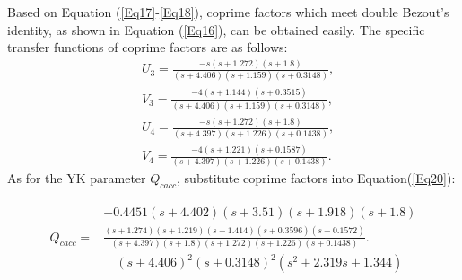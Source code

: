 \documentclass[trsc,nonblindrev]{informs3} %
\begin{document}
Based on Equation (\ref{Eq17}-\ref{Eq18}), coprime factors which meet double Bezout's identity, as shown in Equation (\ref{Eq16}), can be obtained easily. The specific transfer functions of coprime factors are as follows:
\begin{equation}
    \begin{aligned}
         & U_{3}=\frac{-s(s+1.272)(s+1.8)}{(s+4.406)(s+1.159)(s+0.3148)},    \\
         & V_{3}=\frac{-4(s+1.144)(s+0.3515)}{(s+4.406)(s+1.159)(s+0.3148)}, \\
         & U_{4}=\frac{-s(s+1.272)(s+1.8)}{(s+4.397)(s+1.226)(s+0.1438)},    \\
         & V_{4}=\frac{-4(s+1.221)(s+0.1587)}{(s+4.397)(s+1.226)(s+0.1438)}.
    \end{aligned}
\end{equation}
As for the YK parameter $Q_{cacc}$, substitute coprime factors into Equation(\ref{Eq20}):
\begin{small}
    \begin{equation}
        \begin{gathered}
            \begin{aligned}
                             & -0.4451(s+4.402)(s+3.51)(s+1.918)(s+1.8)                                                              \\
                Q_{c a c c}= & \frac{(s+1.274)(s+1.219)(s+1.414)(s+0.3596)(s+0.1572)}{(s+4.397)(s+1.8)(s+1.272)(s+1.226)(s+0.1438)}. \\
                             & \quad (s+4.406)^{2}(s+0.3148)^{2}\left(s^{2}+2.319 s+1.344\right)
            \end{aligned}
        \end{gathered}
    \end{equation}
\end{small}
\end{document}
